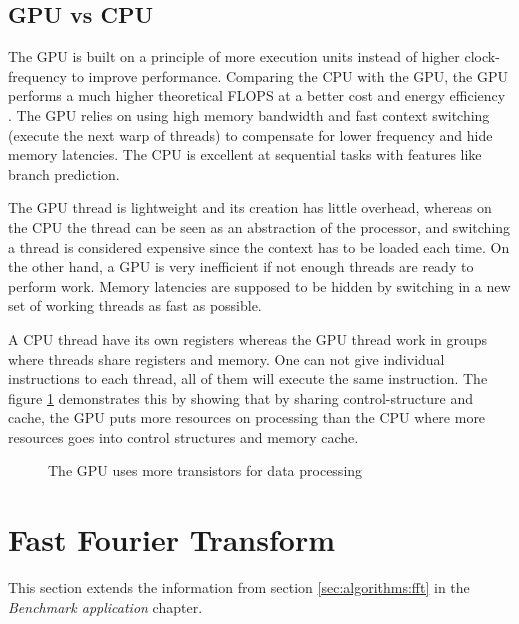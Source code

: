 \subsection{GPU vs CPU}

The \gls{GPU} is built on a principle of more execution units instead of higher clock-frequency to improve performance. Comparing the \gls{CPU} with the \gls{GPU}, the \gls{GPU} performs a much higher theoretical \gls{FLOPS} at a better cost and energy efficiency \cite{owens2007survey}. The \gls{GPU} relies on using high memory bandwidth and fast context switching (execute the next warp of threads) to compensate for lower frequency and hide memory latencies. The \gls{CPU} is excellent at sequential tasks with features like branch prediction.

The \gls{GPU} thread is lightweight and its creation has little overhead, whereas on the \gls{CPU} the thread can be seen as an abstraction of the processor, and switching a thread is considered expensive since the context has to be loaded each time. On the other hand, a \gls{GPU} is very inefficient if not enough threads are ready to perform work. Memory latencies are supposed to be hidden by switching in a new set of working threads as fast as possible.

A \gls{CPU} thread have its own registers whereas the \gls{GPU} thread work in groups where threads share registers and memory. One can not give individual instructions to each thread, all of them will execute the same instruction. The figure \ref{fig:gpu-vs-cpu} demonstrates this by showing that by sharing control-structure and cache, the \gls{GPU} puts more resources on processing than the \gls{CPU} where more resources goes into control structures and memory cache.

\begin{figure}
	\centering
	
	\caption{The GPU uses more transistors for data processing}
	\label{fig:gpu-vs-cpu}
\end{figure}

\section{Fast Fourier Transform}

This section extends the information from section \ref{sec:algorithms:fft} in the \textit{Benchmark application} chapter.

\subsection{\CTALG}

